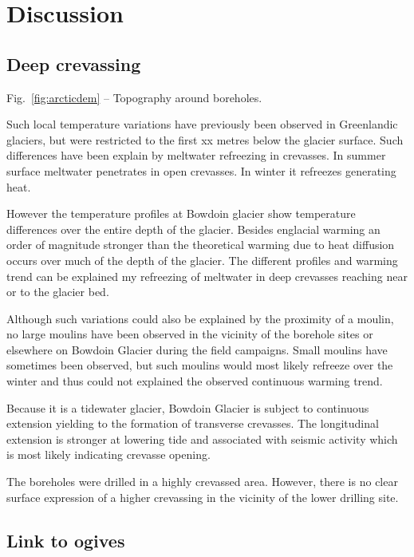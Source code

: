 \documentclass[utf8]{article}
\begin{document}
\section{Discussion}

\subsection{Deep crevassing}

    Fig.~\ref{fig:arcticdem} -- Topography around boreholes.

    Such local temperature variations have previously been observed in
    Greenlandic glaciers, but were restricted to the first xx metres below
    the glacier surface. Such differences have been explain by meltwater
    refreezing in crevasses. In summer surface meltwater penetrates in open
    crevasses. In winter it refreezes generating heat.

    However the temperature profiles at Bowdoin glacier show temperature
    differences over the entire depth of the glacier. Besides englacial warming
    an order of magnitude stronger than the theoretical warming due to heat
    diffusion occurs over much of the depth of the glacier. The different
    profiles and warming trend can be explained my refreezing of meltwater
    in deep crevasses reaching near or to the glacier bed.

    Although such variations could also be explained by the proximity of a
    moulin, no large moulins have been observed in the vicinity of the borehole
    sites or elsewhere on Bowdoin Glacier during the field campaigns. Small
    moulins have sometimes been observed, but such moulins would most likely
    refreeze over the winter and thus could not explained the observed
    continuous warming trend.

    Because it is a tidewater glacier, Bowdoin Glacier is subject to continuous
    extension yielding to the formation of transverse crevasses. The
    longitudinal extension is stronger at lowering tide and associated with
    seismic activity which is most likely indicating crevasse opening.

    The boreholes were drilled in a highly crevassed area. However, there is
    no clear surface expression of a higher crevassing in the vicinity of the
    lower drilling site.

\subsection{Link to ogives}
\end{document}
